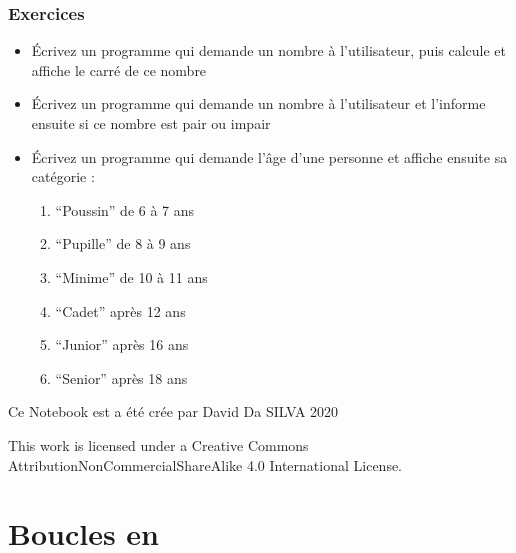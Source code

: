 \documentclass[letterpaper,10pt,english]{sphinxmanual}
\begin{document}
\subsection{Exercices}
\label{\detokenize{src/OCI03_Booleans_IfBlock:exercices}}\begin{itemize}
\item {} 
Écrivez un programme qui demande un nombre à l’utilisateur, puis calcule et affiche le carré de ce nombre

\end{itemize}
\begin{itemize}
\item {} 
Écrivez un programme qui demande un nombre à l’utilisateur et l’informe ensuite si ce nombre est pair ou impair

\end{itemize}
\begin{itemize}
\item {} 
Écrivez un programme qui demande l’âge d’une personne et affiche ensuite sa catégorie :
\begin{enumerate}
%
\item {} 
“Poussin” de 6 à 7 ans

\item {} 
“Pupille” de 8 à 9 ans

\item {} 
“Minime” de 10 à 11 ans

\item {} 
“Cadet” après 12 ans

\item {} 
“Junior” après 16 ans

\item {} 
“Senior” après 18 ans

\end{enumerate}

\end{itemize}

Ce Notebook est a été crée par David Da SILVA \sphinxhyphen{} 2020

This work is licensed under a Creative Commons Attribution\sphinxhyphen{}NonCommercial\sphinxhyphen{}ShareAlike 4.0 International License.


\chapter{Boucles en }
\label{\detokenize{src/OCI04_Boucles:boucles-en-python}}\label{\detokenize{src/OCI04_Boucles::doc}}
\end{document}
